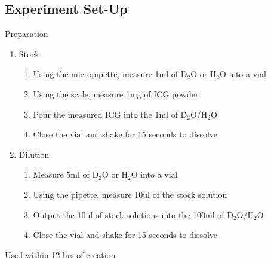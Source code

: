 \subsection{Experiment Set-Up}

Preparation

\begin {enumerate}
\item Stock
\begin{enumerate}
	\item Using the micropipette, measure 1ml of D${}_2$O or H${}_2$O into a vial
	\item Using the scale, measure 1mg of ICG powder
	\item Pour the measured ICG into the 1ml of D${}_2$O/H${}_2$O
	\item Close the vial and shake for 15 seconds to dissolve
\end{enumerate}

\item Dilution
\begin{enumerate}
	\item Measure 5ml of D${}_2$O or H${}_2$O into a vial
	\item Using the pipette, measure 10ul of the stock solution
	\item Output the 10ul of stock solutions into the 100ml of D${}_2$O/H${}_2$O
	\item Close the vial and shake for 15 seconds to dissolve
\end{enumerate}
\end{enumerate}

Used within 12 hrs of creation

